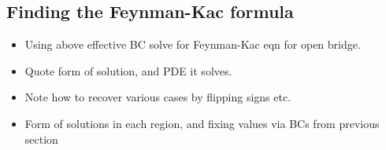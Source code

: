\subsection{Finding the Feynman-Kac formula}

\begin{itemize}
  \item {Using above effective BC solve for Feynman-Kac eqn for open bridge.}
    \item Quote form of solution, and PDE it solves.  
    \item Note how to recover various cases by flipping signs etc.  
  \item Form of solutions in each region, and fixing values via BCs from previous section

\end{itemize}
